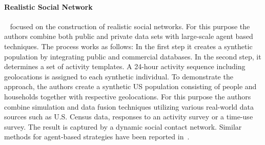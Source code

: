 
\paragraph{Realistic Social Network}
~\cite{Barrett:2009:GAL:1995456.1995598} focused on the construction of
realistic social networks. For this purpose the authors combine both public and private data sets
with large-scale agent based techniques. The process works as follows: In the first step
it creates a synthetic population by integrating public and commercial databases. In the second step, it determines a set of activity templates. A 24-hour activity sequence including
geolocations is assigned to each synthetic individual. To demonstrate the approach, the authors create a synthetic US population consisting of people and households together with respective geolocations. For this purpose the authors combine simulation and data fusion techniques utilizing various real-world data sources such as U.S. Census data, responses to an activity survey or a time-use survey. %
The result is captured by a dynamic social contact network. Similar methods for agent-based strategies have been reported in~\cite{Bernstein:2013:SAS:2499604.2499609}.


